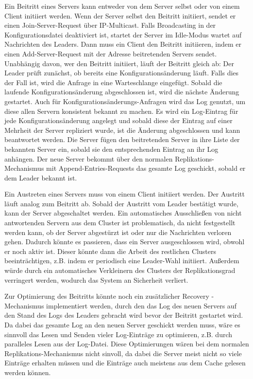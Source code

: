 Ein Beitritt eines Servers kann entweder von dem Server selbst oder von einem Client initiiert werden. Wenn der Server selbst den Beitritt initiiert, sendet er einen Join-Server-Request über IP-Multicast. Falls Broadcasting in der Konfigurationsdatei deaktiviert ist, startet der Server im Idle-Modus wartet auf Nachrichten des Leaders. Dann muss ein Client den Beitritt initiieren, indem er einen Add-Server-Request mit der Adresse beitretenden Servers sendet. Unabhängig davon, wer den Beitritt initiiert, läuft der Beitritt gleich ab: Der Leader prüft zunächst, ob bereits eine Konfigurationsänderung läuft. Falls dies der Fall ist, wird die Anfrage in eine Warteschlange eingefügt. Sobald die laufende Konfigurationsänderung abgeschlossen ist, wird die nächste Änderung gestartet. Auch für Konfigurationsänderungs-Anfragen wird das Log genutzt, um diese allen Servern konsistent bekannt zu machen. Es wird ein Log-Eintrag für jede Konfigurationsänderung angelegt und sobald diese der Eintrag auf einer Mehrheit der Server repliziert wurde, ist die Änderung abgeschlossen und kann beantwortet werden. Die Server fügen den beitretenden Server in ihre Liste der bekannten Server ein, sobald sie den entsprechenden Eintrag an ihr Log anhängen. Der neue Server bekommt über den normalen Replikations-Mechanismus mit Append-Entries-Requests das gesamte Log geschickt, sobald er dem Leader bekannt ist.

Ein Austreten eines Servers muss von einem Client initiiert werden. Der Austritt läuft analog zum Beitritt ab. Sobald der Austritt vom Leader bestätigt wurde, kann der Server abgeschaltet werden. Ein automatisches Ausschließen von nicht antwortenden Servern aus dem Cluster ist problematisch, da nicht festgestellt werden kann, ob der Server abgestürzt ist oder nur die Nachrichten verloren gehen. Dadurch könnte es passieren, dass ein Server ausgeschlossen wird, obwohl er noch aktiv ist. Dieser könnte dann die Arbeit des restlichen Clusters beeinträchtigen, z.B. indem er periodisch eine Leader-Wahl initiiert. Außerdem würde durch ein automatisches Verkleinern des Clusters der Replikationsgrad verringert werden, wodurch das System an Sicherheit verliert.

Zur Optimierung des Beitritts könnte noch ein zusätzlicher \glqq Recovery \grqq-Mechanismus implementiert werden, durch den das Log des neuen Servers auf den Stand des Logs des Leaders gebracht wird bevor der Beitritt gestartet wird. Da dabei das gesamte Log an den neuen Server geschickt werden muss, wäre es sinnvoll das Lesen und Senden vieler Log-Einträge zu optimieren, z.B. durch paralleles Lesen aus der Log-Datei. Diese Optimierungen wären bei dem normalen Replikations-Mechanismus nicht sinvoll, da dabei die Server meist nicht so viele Einträge erhalten müssen und die Einträge auch meistens aus dem Cache gelesen werden können.

